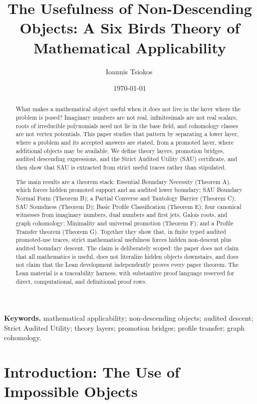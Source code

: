 \documentclass[11pt]{article}
\title{The Usefulness of Non-Descending Objects: A Six Birds Theory of Mathematical Applicability}
\author{Ioannis Tsiokos\,\orcidlink{0009-0009-7659-5964}}
\date{\today}
\theoremstyle{definition}
\begin{document}
\maketitle
\thispagestyle{firstpage}

\begin{abstract}
What makes a mathematical object useful when it does not live in the layer
where the problem is posed?  Imaginary numbers are not real, infinitesimals are
not real scalars, roots of irreducible polynomials need not lie in the base
field, and cohomology classes are not vertex potentials.  This paper studies
that pattern by separating a lower layer, where a problem and its accepted
answers are stated, from a promoted layer, where additional objects may be
available.  We define theory layers, promotion bridges, audited descending
expressions, and the Strict Audited Utility (SAU) certificate, and then show
that SAU is extracted from strict useful traces rather than stipulated.

The main results are a theorem stack: Essential Boundary Necessity (Theorem
A), which forces hidden promoted support and an audited lower boundary; SAU
Boundary Normal Form (Theorem B); a Partial Converse and Tautology Barrier
(Theorem C); SAU Soundness (Theorem D); Basic Profile Classification (Theorem
E); four canonical witnesses from imaginary numbers, dual numbers and first
jets, Galois roots, and graph cohomology; Minimality and universal promotion
(Theorem F); and a Profile Transfer theorem (Theorem G).  Together they show
that, in finite typed audited promoted-use traces, strict mathematical
usefulness forces hidden non-descent plus audited boundary descent.  The claim
is deliberately scoped: the paper does not claim that all mathematics is
useful, does not literalize hidden objects downstairs, and does not claim that
the Lean development independently proves every paper theorem.  The Lean
material is a traceability harness, with substantive proof language reserved
for direct, computational, and definitional proof rows.
\end{abstract}

\medskip
\noindent\textbf{Keywords.} mathematical applicability; non-descending objects; audited descent; Strict Audited Utility; theory layers; promotion bridges; profile transfer; graph cohomology.

\section{Introduction: The Use of Impossible Objects}\label{sec:intro}
\end{document}
